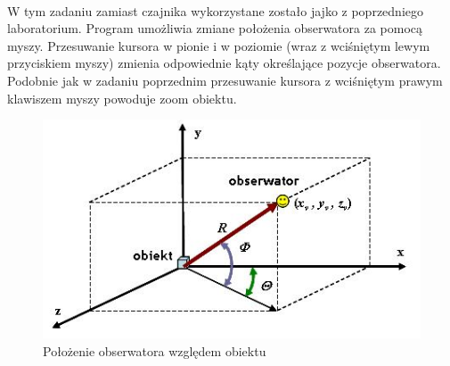 \documentclass[wide,a4paper,titlepage,12pt] {article}
\begin{document}
  \paragraph{}
  W tym zadaniu zamiast czajnika wykorzystane zostało jajko z poprzedniego laboratorium. Program umożliwia zmiane położenia obserwatora za pomocą myszy. Przesuwanie kursora w pionie i w poziomie (wraz z wciśniętym lewym przyciskiem myszy) zmienia odpowiednie kąty określające pozycje obserwatora. Podobnie jak w zadaniu poprzednim przesuwanie kursora z wciśniętym prawym klawiszem myszy powoduje zoom obiektu.
  \newpage
  \begin{figure}[h!]
    \begin{center}
      \includegraphics[width=\textwidth]{3.jpg}
      \caption{Położenie obserwatora względem obiektu}
    \end{center}
  \end{figure}


  \paragraph{}
  
\end{document}
